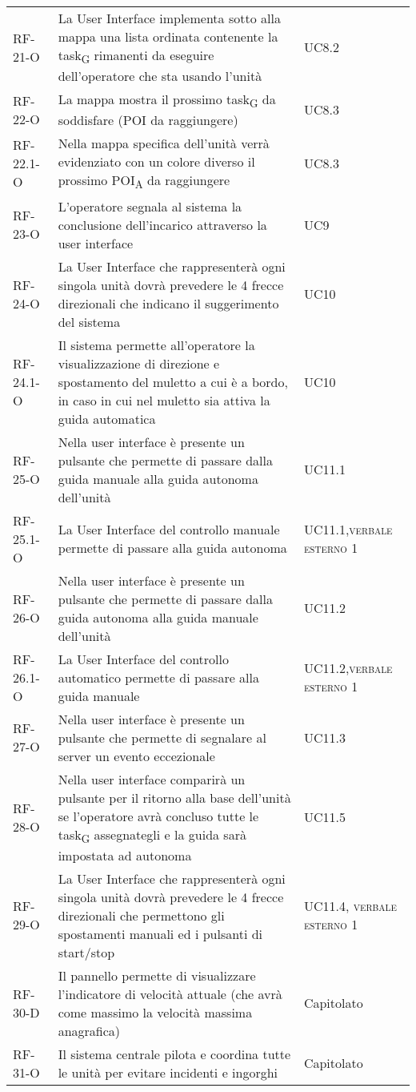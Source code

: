\begin{longtable}{ 
		>{}p{} 
		>{}p{}
		>{\centering}p{} }
RF-21-O & La User Interface implementa sotto alla mappa una lista ordinata contenente la \gls{task}\textsubscript{G} rimanenti da eseguire dell’operatore che sta usando l’unità & UC8.2\tabularnewline
RF-22-O & La mappa mostra il prossimo \gls{task}\textsubscript{G} da soddisfare (POI da raggiungere) & UC8.3\tabularnewline
RF-22.1-O & Nella mappa specifica dell’unità verrà evidenziato con un colore diverso il prossimo \acrshort{POI}\textsubscript{A} da raggiungere & UC8.3\tabularnewline
RF-23-O & L’operatore segnala al sistema la conclusione dell’incarico attraverso la user interface & UC9\tabularnewline
RF-24-O & La User Interface che rappresenterà ogni singola unità dovrà prevedere le 4 frecce direzionali che indicano il suggerimento del sistema & UC10\tabularnewline
RF-24.1-O & Il sistema permette all’operatore la visualizzazione di direzione e spostamento del muletto a cui è a bordo, in caso in cui nel muletto sia attiva la guida automatica & UC10\tabularnewline
RF-25-O & Nella user interface è presente un pulsante che permette di passare dalla guida manuale alla guida autonoma dell’unità & UC11.1\tabularnewline
RF-25.1-O & La User Interface del controllo manuale permette di passare alla guida autonoma & UC11.1,\newline \textsc{verbale esterno 1}\tabularnewline
RF-26-O & Nella user interface è presente un pulsante che permette di passare dalla guida autonoma alla guida manuale dell’unità & UC11.2\tabularnewline
RF-26.1-O & La User Interface del controllo automatico permette di passare alla guida manuale & UC11.2,\newline \textsc{verbale esterno 1}\tabularnewline
RF-27-O & Nella user interface è presente un pulsante che permette di segnalare al server un evento eccezionale & UC11.3\tabularnewline
RF-28-O & Nella user interface comparirà  un pulsante per il ritorno alla base dell’unità se l'operatore avrà concluso tutte le \gls{task}\textsubscript{G} assegnategli e la guida sarà impostata ad autonoma  & UC11.5\tabularnewline
RF-29-O & La User Interface che rappresenterà ogni singola unità dovrà prevedere le 4 frecce direzionali che permettono gli spostamenti manuali ed i pulsanti di start/stop & UC11.4, \newline \textsc{verbale esterno 1}\tabularnewline
RF-30-D & Il pannello permette di visualizzare l’indicatore di velocità attuale (che avrà come massimo la velocità massima anagrafica) & Capitolato\tabularnewline
RF-31-O & Il sistema centrale pilota e coordina tutte le unità per evitare incidenti e ingorghi & Capitolato\tabularnewline

\end{longtable}
